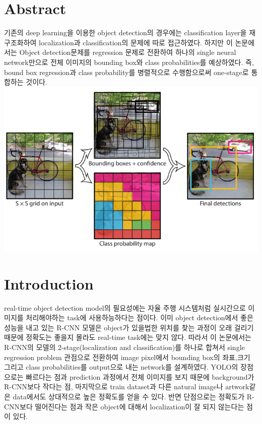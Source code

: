 \documentclass[extendedabs]{bmvc2k}
\begin{document}
\section{Abstract}
 \quad 기존의 deep learning을 이용한 object detection의 경우에는 classification layer을 재구조화하여 localization과 classification의 문제에 
 따로 접근하였다. 하지만 이 논문에서는 Object detection문제를 regression 문제로 전환하여 하나의 single neural network만으로 전체 이미지의 
 bounding box와 class probabilities를 예상하였다.  즉, bound box regression과 class probability를 병렬적으로 수행함으로써 one-stage로 통합하는 것이다. 
 \newline  \includegraphics[width=\linewidth]{images/00_YOLO.PNG}
 
\section{Introduction}
 \quad real-time object detection model의 필요성에는 자율 주행 시스템처럼 실시간으로 이미지를 처리해야하는 task에 사용하능하다는 점이다.
 이미 object detection에서 좋은 성능을 내고 있는 R-CNN 모델은 object가 있을법한 위치를 찾는 과정이 오래 걸리기 때문에 정확도는 좋을지 몰라도 real-time task에는
 맞지 않다. 따라서 이 논문에서는 R-CNN의 모델의 2-stage(localization and classification)를 하나로 합쳐서 single regression problem 관점으로 전환하여 
 image pixel에서 bounding box의 좌표,크기 그리고 class probabilities를 output으로 내는 network를 설계하였다. YOLO의 장점으로는 빠르다는 점과 prediction 과정에서
 전체 이미지를 보지 때문에 background가 R-CNN보다 작다는 점, 마지막으로 train dataset과 다른 natural image나 artwork같은 data에서도 상대적으로 높은 정확도를 얻을 수 있다.
 반면 단점으로는 정확도가 R-CNN보다 떨어진다는 점과 작은 object에 대해서 localization이 잘 되지 않는다는 점이 있다.
\end{document}
